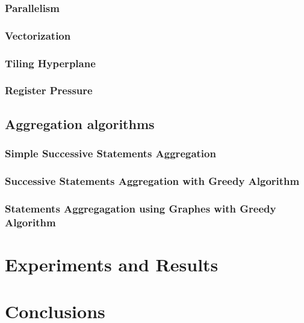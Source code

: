 \documentclass[paper=a4, fontsize=11pt]{scrartcl}
\numberwithin{equation}{section}        %
\numberwithin{figure}{section}          %
\numberwithin{table}{section}               %
\begin{document}
        \subsubsection{Parallelism}
        \subsubsection{Vectorization}
        \subsubsection{Tiling Hyperplane}
        \subsubsection{Register Pressure}
    \subsection{Aggregation algorithms}
        \subsubsection{Simple Successive Statements Aggregation}
        \subsubsection{Successive Statements Aggregation with Greedy Algorithm}
        \subsubsection{Statements Aggregagation using Graphes with Greedy Algorithm}

\section{Experiments and Results}

\section{Conclusions}




\end{document}
